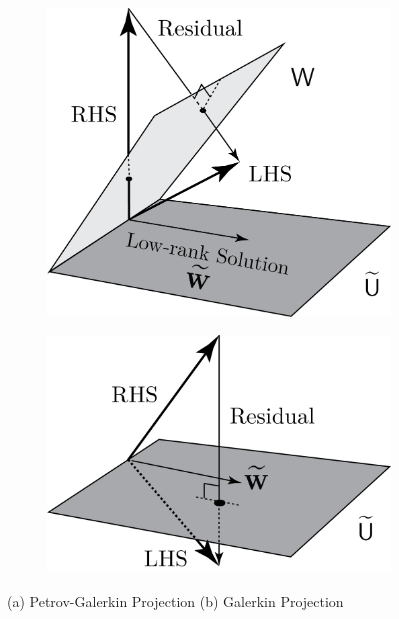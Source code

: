 \documentclass[11pt]{article}
\begin{document}
\begin{figure}[t]
    \centering
    \begin{subfigure}[b]{0.35\linewidth}
    \centering
    \includegraphics[width=\linewidth]{PG.png}
    \caption{}
    \label{fig:projections_PG}
    \end{subfigure}\hfill
    \begin{subfigure}[b]{0.35\linewidth}
    \centering
    \includegraphics[width=\linewidth]{G.png}
    \caption{}
    \label{fig:projections_G}
    \end{subfigure}
    \caption{(a) Petrov-Galerkin Projection (b) Galerkin Projection}
    \label{fig:projections}
    \end{figure}
\end{document}
